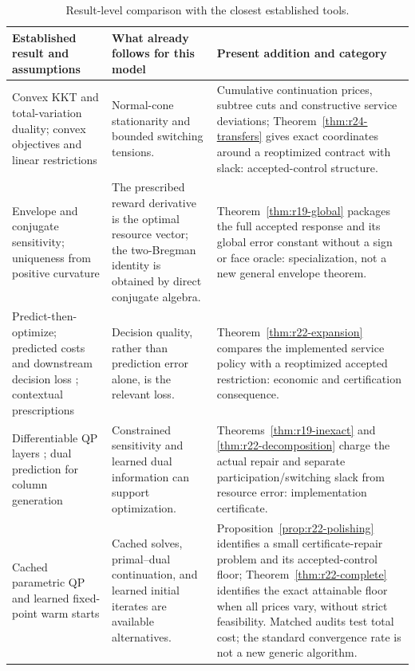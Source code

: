 \documentclass[11pt,letterpaper]{article}
\theoremstyle{definition}
\newcommand{\1}{\mathbf 1}
\begin{document}
\begin{table}[tbp]\centering\small
\caption{Result-level comparison with the closest established tools.}
\label{tab:r22-novelty}
\begin{tabular}{p{}p{}p{}}
\toprule
Established result and assumptions & What already follows for this model & Present addition and category\\
\midrule
Convex KKT and total-variation duality; convex objectives and linear restrictions \citep{BoydVandenberghe2004,TibshiraniTaylor2011}
& Normal-cone stationarity and bounded switching tensions.
& Cumulative continuation prices, subtree cuts and constructive service deviations; Theorem~\ref{thm:r24-transfers} gives exact coordinates around a reoptimized contract with slack: accepted-control structure.\\
Envelope and conjugate sensitivity; uniqueness from positive curvature \citep{BoydVandenberghe2004}
& The prescribed reward derivative is the optimal resource vector; the two-Bregman identity is obtained by direct conjugate algebra.
& Theorem~\ref{thm:r19-global} packages the full accepted response and its global error constant without a sign or face oracle: specialization, not a new general envelope theorem.\\
Predict-then-optimize; predicted costs and downstream decision loss \citep{ElmachtoubGrigas2022}; contextual prescriptions \citep{BertsimasKallus2020}
& Decision quality, rather than prediction error alone, is the relevant loss.
& Theorem~\ref{thm:r22-expansion} compares the implemented service policy with a reoptimized accepted restriction: economic and certification consequence.\\
Differentiable QP layers \citep{AmosKolter2017}; dual prediction for column generation \citep{KraulSeizingerBrunner2023}
& Constrained sensitivity and learned dual information can support optimization.
& Theorems~\ref{thm:r19-inexact} and \ref{thm:r22-decomposition} charge the actual repair and separate participation/switching slack from resource error: implementation certificate.\\
Cached parametric QP and learned fixed-point warm starts \citep{Stellato2020,Sambharya2024}
& Cached solves, primal--dual continuation, and learned initial iterates are available alternatives.
& Proposition~\ref{prop:r22-polishing} identifies a small certificate-repair problem and its accepted-control floor; Theorem~\ref{thm:r22-complete} identifies the exact attainable floor when all prices vary, without strict feasibility. Matched audits test total cost; the standard convergence rate is not a new generic algorithm.\\

\end{tabular}
\end{table}
\end{document}
